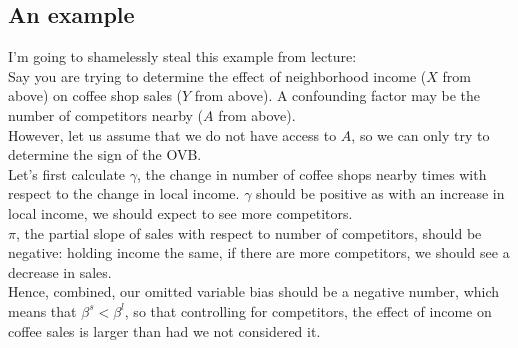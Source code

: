 \documentclass{article}
\begin{document}
\subsection{An example}
I'm going to shamelessly steal this example from lecture:
\\
Say you are trying to determine the effect of neighborhood income ($X$ from above) on coffee shop sales ($Y$ from above).
A confounding factor may be the number of competitors nearby ($A$ from above).
\\
However, let us assume that we do not have access to $A$, so we can only try to determine the sign of the OVB.
\\
Let's first calculate $\gamma$, the change in number of coffee shops nearby times with respect to the change in local income.
$\gamma$ should be positive as with an increase in local income, we should expect to see more competitors.
\\
$\pi$, the partial slope of sales with respect to number of competitors, should be negative: holding income the same, if there are more competitors, we should see a decrease in sales.
\\
Hence, combined, our omitted variable bias should be a negative number, which means that $\beta^s < \beta^l$, so that controlling for competitors, the effect of income on coffee sales is larger than had we not considered it.
\end{document}
